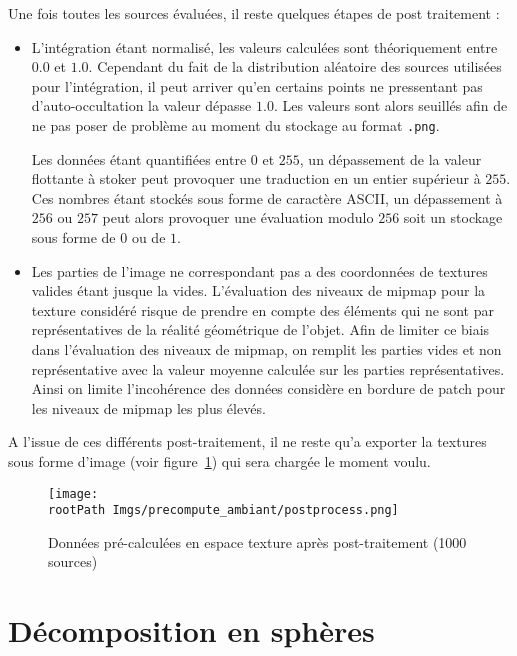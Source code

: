 \documentclass[10pt,a4paper,twoside, twocolumn]{report}
\newcommand*{\rootPath}{../}
\begin{document}
Une fois toutes les sources évaluées, il reste quelques étapes de post traitement :
\begin{itemize}
	\item L'intégration étant normalisé, les valeurs calculées sont théoriquement entre $0.0$ et $1.0$. Cependant du fait de la distribution aléatoire des sources utilisées pour l'intégration, il peut arriver qu'en certains points ne pressentant pas d'auto-occultation la valeur dépasse $1.0$. Les valeurs sont alors seuillés afin de ne pas poser de problème au moment du stockage au format \texttt{.png}.

	Les données étant quantifiées entre $0$ et $255$, un dépassement de la valeur flottante à stoker peut provoquer une traduction en un entier supérieur à $255$. Ces nombres étant stockés sous forme de caractère ASCII, un dépassement à $256$ ou $257$ peut alors provoquer une évaluation modulo $256$ soit un stockage sous forme de $0$ ou de $1$.

	\item Les parties de l'image ne correspondant pas a des coordonnées de textures valides étant jusque la vides. L'évaluation des niveaux de mipmap pour la texture considéré risque de prendre en compte des éléments qui ne sont par représentatives de la réalité géométrique de l'objet. Afin de limiter ce biais dans l'évaluation des niveaux de mipmap, on remplit les parties vides et non représentative avec la valeur moyenne calculée sur les parties représentatives. Ainsi on limite l’incohérence des données considère en bordure de patch pour les niveaux de mipmap les plus élevés.
\end{itemize}

A l'issue de ces différents post-traitement, il ne reste qu'a exporter la textures sous forme d'image (voir figure~\ref{fig:precompute_ambiant:postprocess}) qui sera chargée le moment voulu.

\begin{figure}[!ht]\centering
	\texttt{[image: \\rootPath Imgs/precompute\_ambiant/postprocess.png]}
	\caption{Données pré-calculées en espace texture après post-traitement (1000 sources)}
	\label{fig:precompute_ambiant:postprocess}
\end{figure}

\section{Décomposition en sphères}





\ifstandalone
	
	
\fi
\end{document}
